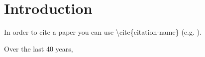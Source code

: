 \chapter{Introduction}

\noindent \lettrine[lines=2, nindent=0em]{\textcolor{UNIPDRED}{I}}{}n order to cite a paper you can use \textbackslash cite\{citation-name\} (e.g. \cite{1990Gabow}).

Over the last 40 years, \lipsum

